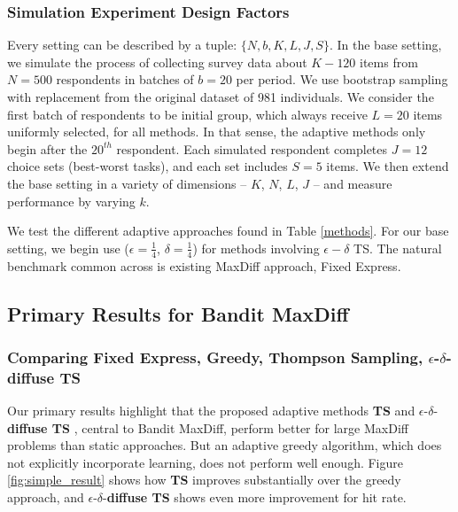 \documentclass[nonblindrev]{informs3}
\newcommand{\ts}{\textbf{TS} }
\newcommand{\edts}{$\epsilon$-$\delta$-\textbf{diffuse TS} }
\newcommand{\numperset}{L}
\begin{document}
\subsubsection{Simulation Experiment Design Factors}

Every setting can be described by a tuple: $\{N,b,K,\numperset,J,S\}$. In the base setting, we simulate the process of collecting survey data about $K-120$ items from $N=500$ respondents in batches of $b=20$ per period. We use bootstrap sampling with replacement from the original dataset of 981 individuals. We consider the first batch of respondents to be initial group, which always receive $\numperset=20$ items uniformly selected, for all methods. In that sense, the adaptive methods only begin after the $20^{th}$ respondent. Each simulated respondent completes $J=12$ choice sets (best-worst tasks), and each set includes $S=5$ items. We then extend the base setting in a variety of dimensions -- $K$, $N$, $\numperset$, $J$ -- and measure performance by varying $k$.

We test the different adaptive approaches found in Table \ref{methods}. For our base setting, we begin use ($\epsilon=\frac{1}{4}$, $\delta=\frac{1}{4}$) for methods involving $\epsilon-\delta$ TS. The natural benchmark common across is existing MaxDiff approach, Fixed Express.


\subsection{Primary Results for Bandit MaxDiff}

\subsubsection{Comparing Fixed Express, Greedy, Thompson Sampling, \edts}

Our primary results highlight that the proposed adaptive methods \ts and \edts, central to Bandit MaxDiff, perform better for large MaxDiff problems than static approaches. But an adaptive greedy algorithm, which does not explicitly incorporate learning, does not perform well enough. Figure \ref{fig:simple_result} shows how \ts improves substantially over the greedy approach, and \edts shows even more improvement for hit rate.
\end{document}
